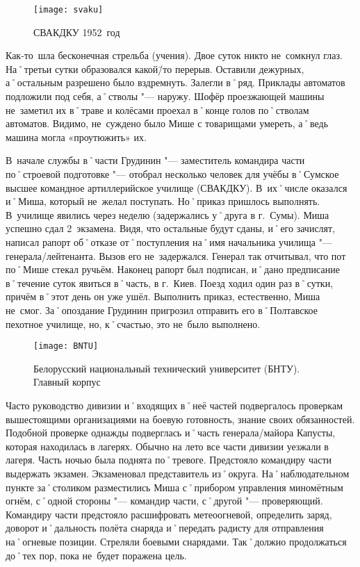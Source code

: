 \begin{wrapfigure}{O}{.4\textwidth}
\centering
\texttt{[image: svaku]}
\caption[СВАКДКУ 1952~год]{СВАКДКУ 1952~год\footnotemark}
\label{fig:svaku}
\end{wrapfigure}

Как-то~шла бесконечная стрельба (учения). Двое суток никто не~сомкнул глаз. На˚третьи сутки образовался какой\=/то перерыв. Оставили дежурных, а˚остальным разрешено было вздремнуть. Залегли в˚ряд. Приклады автоматов подложили под себя, а˚стволы "---  наружу. Шофёр проезжающей машины не~заметил их в˚траве и колёсами проехал в˚конце голов по˚стволам автоматов. Видимо, не~суждено было Мише с товарищами умереть, а˚ведь машина могла «проутюжить» их. 

В~начале службы в˚части Грудинин "--- заместитель командира части по˚строевой подготовке "--- отобрал несколько человек для учёбы в˚Сумское высшее командное артиллерийское училище (СВАКДКУ). В~их˚числе оказался и˚Миша, который не~желал поступать. Но˚приказ пришлось выполнять. В~училище явились через неделю (задержались у˚друга в г.~Сумы). Миша успешно сдал 2~экзамена. Видя, что остальные будут сданы, и˚его зачислят, написал рапорт об˚отказе от˚поступления на˚имя начальника училища "--- генерала\-/лейтенанта. Вызов его не~задержался. Генерал так отчитывал, что пот по˚Мише стекал ручьём. Наконец рапорт был подписан, и˚дано предписание в˚течение суток явиться в˚часть, в г.~Киев. Поезд ходил один раз в˚сутки, причём в˚этот день он уже ушёл. Выполнить приказ, естественно, Миша не~смог. За˚опоздание Грудинин пригрозил отправить его в˚Полтавское пехотное училище, но, к˚счастью, это не~было выполнено. 

\begin{wrapfigure}{O}{.4\textwidth}
\centering
\texttt{[image: BNTU]}
\caption[Белорусский национальный технический университет (БНТУ). Главный корпус]{Белорусский национальный технический университет (БНТУ). Главный корпус\footnotemark}
\label{fig:BNTU}
\end{wrapfigure}

Часто руководство дивизии и˚входящих в˚неё частей подвергалось проверкам вышестоящими организациями на боевую готовность, знание своих обязанностей. Подобной проверке однажды подверглась и˚часть генерала\-/майора Капусты, которая находилась в лагерях. Обычно на лето все части дивизии уезжали в лагеря. Часть ночью была поднята по˚тревоге. Предстояло командиру части выдержать экзамен. Экзаменовал представитель из˚округа. На˚наблюдательном пункте за˚столиком разместились Миша с˚прибором управления миномётным огнём, с˚одной стороны "--- командир части, с˚другой "--- проверяющий. Командиру части предстояло расшифровать метеоогневой, определить заряд, доворот и˚дальность полёта снаряда и˚передать радисту для отправления на˚огневые позиции. Стреляли боевыми снарядами. Так˚должно продолжаться до˚тех пор, пока не~будет поражена цель.

